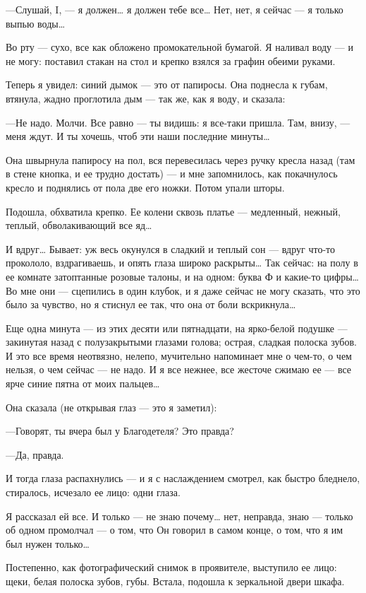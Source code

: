 \documentclass[11pt,openany]{book}
\begin{document}
---Слушай, I, --- я должен\ldots{} я должен тебе все\ldots{} Нет, нет, я сейчас --- я только выпью воды\ldots{}

Во рту --- сухо, все как обложено промокательной бумагой. Я наливал воду --- и не могу: поставил стакан на стол и крепко взялся за графин обеими руками.

Теперь я увидел: синий дымок --- это от папиросы. Она поднесла к губам, втянула, жадно проглотила дым --- так же, как я воду, и сказала:

---Не надо. Молчи. Все равно --- ты видишь: я все-таки пришла. Там, внизу, --- меня ждут. И ты хочешь, чтоб эти наши последние минуты\ldots{}

Она швырнула папиросу на пол, вся перевесилась через ручку кресла назад (там в стене кнопка, и ее трудно достать) --- и мне запомнилось, как покачнулось кресло и поднялись от пола две его ножки. Потом упали шторы.

Подошла, обхватила крепко. Ее колени сквозь платье --- медленный, нежный, теплый, обволакивающий все яд\ldots{}

И вдруг\ldots{} Бывает: уж весь окунулся в сладкий и теплый сон --- вдруг что-то прокололо, вздрагиваешь, и опять глаза широко раскрыты\ldots{} Так сейчас: на полу в ее комнате затоптанные розовые талоны, и на одном: буква Ф и какие-то цифры\ldots{} Во мне они --- сцепились в один клубок, и я даже сейчас не могу сказать, что это было за чувство, но я стиснул ее так, что она от боли вскрикнула\ldots{}

Еще одна минута --- из этих десяти или пятнадцати, на ярко-белой подушке --- закинутая назад с полузакрытыми глазами голова; острая, сладкая полоска зубов. И это все время неотвязно, нелепо, мучительно напоминает мне о чем-то, о чем нельзя, о чем сейчас --- не надо. И я все нежнее, все жесточе сжимаю ее --- все ярче синие пятна от моих пальцев\ldots{}

Она сказала (не открывая глаз --- это я заметил):

---Говорят, ты вчера был у Благодетеля? Это правда?

---Да, правда.

И тогда глаза распахнулись --- и я с наслаждением смотрел, как быстро бледнело, стиралось, исчезало ее лицо: одни глаза.

Я рассказал ей все. И только --- не знаю почему\ldots{} нет, неправда, знаю --- только об одном промолчал --- о том, что Он говорил в самом конце, о том, что я им был нужен только\ldots{}

Постепенно, как фотографический снимок в проявителе, выступило ее лицо: щеки, белая полоска зубов, губы. Встала, подошла к зеркальной двери шкафа.
\end{document}

